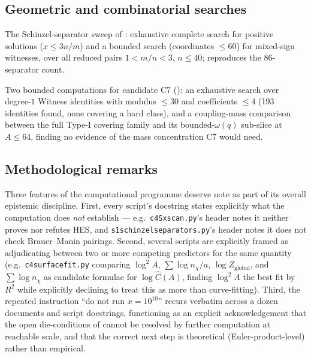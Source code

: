 \documentclass[11pt]{article}
\theoremstyle{plain}
\theoremstyle{definition}
\theoremstyle{remark}
\newcommand{\file}[1]{\texttt{#1}}
\renewcommand{\_}{\textunderscore\allowbreak}
\begin{document}
\subsection{Geometric and combinatorial searches}
\label{subsec:computation-misc}
\begin{description}[leftmargin=1.6em]
  \item[\file{s1\_schinzel\_separators.py}] The Schinzel-separator sweep of
        : exhaustive complete search for positive solutions
        ($x\le3n/m$) and a bounded search (coordinates $\le60$) for mixed-sign witnesses, over
        all reduced pairs $1<m/n<3$, $n\le40$; reproduces the 86-separator count.
  \item[\file{c7\_bounded\_coupling\_search.py}] Two bounded computations for candidate C7
        (): an exhaustive search over degree-$1$ Witness identities with
        modulus $\le30$ and coefficients $\le4$ (193 identities found, none covering a hard
        class), and a coupling-mass comparison between the full Type-I covering family and its
        bounded-$\omega(q)$ sub-slice at $A\le64$, finding no evidence of the mass
        concentration C7 would need.
\end{description}

\subsection{Methodological remarks}
Three features of the computational programme deserve note as part of its overall
epistemic discipline. First, every script's docstring states explicitly what the computation
does \emph{not} establish — e.g.\ \file{c4\_S\_xscan.py}'s header notes it neither proves nor
refutes H\_ES, and \file{s1\_schinzel\_separators.py}'s header notes it does not check
Brauer--Manin pairings. Second, several scripts are explicitly framed as adjudicating between
two or more competing predictors for the same quantity (e.g.\ \file{c4\_surface\_fit.py}
comparing $\log^2A$, $\sum\log n_\chi/a$, $\log Z_{\mathrm{global}}$, and $\sum\log n_\chi$ as
candidate formulae for $\log\widehat C(A)$, finding $\log^2A$ the best fit by $R^2$ while
explicitly declining to treat this as more than curve-fitting). Third, the repeated instruction
``do not run $x=10^{10}$'' recurs verbatim across a dozen documents and script docstrings,
functioning as an explicit acknowledgement that the open die-conditions of
 cannot be resolved by further computation at reachable scale, and
that the correct next step is theoretical (Euler-product-level) rather than empirical.
\end{document}
